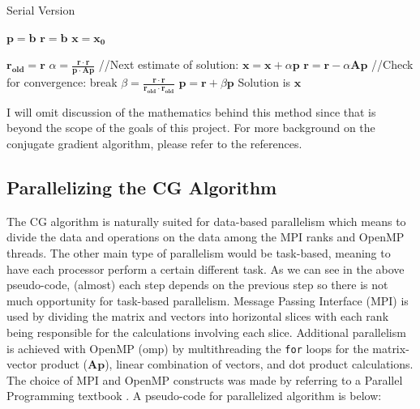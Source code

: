 \documentclass{article}
\begin{document}
\begin{algorithm}
	\begin{algorithmic}[1]
		\caption{Serial Version}
		\State $\mathbf{p} = \mathbf{b}$
		\State $\mathbf{r} = \mathbf{b}$
		\State $\mathbf{x} = \mathbf{x_0}$
		
		\State $\mathbf{r_{old}} = \mathbf{r}$
		\State $\alpha = \frac{\mathbf{r} \cdot \mathbf{r} }{\mathbf{p} \cdot \mathbf{Ap} }$
		\State //Next estimate of solution:
		\State $\mathbf{x} = \mathbf{x} + \alpha \mathbf{p}$
		\State $\mathbf{r} = \mathbf{r} - \alpha \mathbf{Ap}$
		\State //Check for convergence:
		\State break
		\EndIf
		\State $\beta = \frac{\mathbf{r} \cdot \mathbf{r}}{\mathbf{r_{old}} \cdot \mathbf{r_{old}}}$
		\State $\mathbf{p} = \mathbf{r} + \beta \mathbf{p}$
		\EndFor
		\State Solution is $\mathbf{x}$	
	\end{algorithmic}
\end{algorithm}

I will omit discussion of the mathematics behind this method since that is beyond the scope of the goals of this project. For more background on the conjugate gradient algorithm, please refer to the references.

\subsection{Parallelizing the CG Algorithm}
The CG algorithm is naturally suited for data-based parallelism which means to divide the data and operations on the data among the MPI ranks and OpenMP threads. The other main type of parallelism would be task-based, meaning to have each processor perform a certain different task. As we can see in the above pseudo-code, (almost) each step depends on the previous step so there is not much opportunity for task-based parallelism. Message Passing Interface (MPI) is used by dividing the matrix and vectors into horizontal slices with each rank being responsible for the calculations involving each slice. Additional parallelism is achieved with OpenMP (omp) by multithreading the \texttt{for} loops for the matrix-vector product ($\mathbf{Ap}$), linear combination of vectors, and dot product calculations. The choice of MPI and OpenMP constructs was made by referring to a Parallel Programming textbook \cite{Eijkhout}. A pseudo-code for parallelized algorithm is below:
\end{document}

